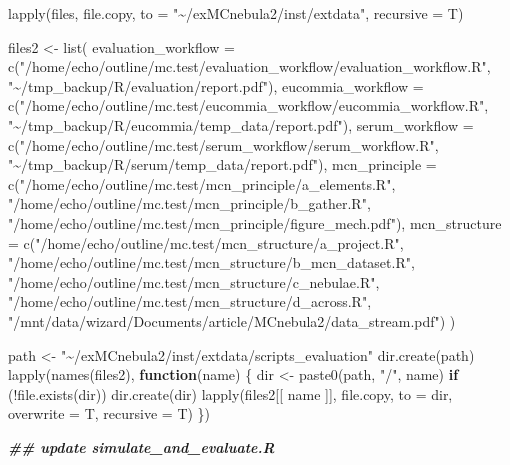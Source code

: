 \documentclass[
]{article}
\newenvironment{Shaded}{\begin{snugshade}}{\end{snugshade}}
\newcommand{\AttributeTok}[1]{\textcolor[rgb]{0.77,0.63,0.00}{#1}}
\newcommand{\ControlFlowTok}[1]{\textcolor[rgb]{0.13,0.29,0.53}{\textbf{#1}}}
\newcommand{\DocumentationTok}[1]{\textcolor[rgb]{0.56,0.35,0.01}{\textbf{\textit{#1}}}}
\newcommand{\FunctionTok}[1]{\textcolor[rgb]{0.00,0.00,0.00}{#1}}
\newcommand{\NormalTok}[1]{#1}
\newcommand{\OtherTok}[1]{\textcolor[rgb]{0.56,0.35,0.01}{#1}}
\newcommand{\SpecialCharTok}[1]{\textcolor[rgb]{0.00,0.00,0.00}{#1}}
\newcommand{\StringTok}[1]{\textcolor[rgb]{0.31,0.60,0.02}{#1}}
\begin{document}
\begin{Shaded}
\begin{Highlighting}[]
\FunctionTok{lapply}\NormalTok{(files, file.copy, }\AttributeTok{to =} \StringTok{"\textasciitilde{}/exMCnebula2/inst/extdata"}\NormalTok{,}
       \AttributeTok{recursive =}\NormalTok{ T)}

\NormalTok{files2 }\OtherTok{\textless{}{-}} \FunctionTok{list}\NormalTok{(}
  \AttributeTok{evaluation\_workflow =} \FunctionTok{c}\NormalTok{(}\StringTok{"/home/echo/outline/mc.test/evaluation\_workflow/evaluation\_workflow.R"}\NormalTok{,}
    \StringTok{"\textasciitilde{}/tmp\_backup/R/evaluation/report.pdf"}\NormalTok{),}
  \AttributeTok{eucommia\_workflow =} \FunctionTok{c}\NormalTok{(}\StringTok{"/home/echo/outline/mc.test/eucommia\_workflow/eucommia\_workflow.R"}\NormalTok{,}
    \StringTok{"\textasciitilde{}/tmp\_backup/R/eucommia/temp\_data/report.pdf"}\NormalTok{),}
  \AttributeTok{serum\_workflow =} \FunctionTok{c}\NormalTok{(}\StringTok{"/home/echo/outline/mc.test/serum\_workflow/serum\_workflow.R"}\NormalTok{,}
    \StringTok{"\textasciitilde{}/tmp\_backup/R/serum/temp\_data/report.pdf"}\NormalTok{),}
  \AttributeTok{mcn\_principle =} \FunctionTok{c}\NormalTok{(}\StringTok{"/home/echo/outline/mc.test/mcn\_principle/a\_elements.R"}\NormalTok{,}
    \StringTok{"/home/echo/outline/mc.test/mcn\_principle/b\_gather.R"}\NormalTok{,}
    \StringTok{"/home/echo/outline/mc.test/mcn\_principle/figure\_mech.pdf"}\NormalTok{),}
  \AttributeTok{mcn\_structure =} \FunctionTok{c}\NormalTok{(}\StringTok{"/home/echo/outline/mc.test/mcn\_structure/a\_project.R"}\NormalTok{,}
    \StringTok{"/home/echo/outline/mc.test/mcn\_structure/b\_mcn\_dataset.R"}\NormalTok{,}
    \StringTok{"/home/echo/outline/mc.test/mcn\_structure/c\_nebulae.R"}\NormalTok{,}
    \StringTok{"/home/echo/outline/mc.test/mcn\_structure/d\_across.R"}\NormalTok{,}
    \StringTok{"/mnt/data/wizard/Documents/article/MCnebula2/data\_stream.pdf"}\NormalTok{)}
\NormalTok{)}

\NormalTok{path }\OtherTok{\textless{}{-}} \StringTok{"\textasciitilde{}/exMCnebula2/inst/extdata/scripts\_evaluation"}
\FunctionTok{dir.create}\NormalTok{(path)}
\FunctionTok{lapply}\NormalTok{(}\FunctionTok{names}\NormalTok{(files2),}
  \ControlFlowTok{function}\NormalTok{(name) \{}
\NormalTok{    dir }\OtherTok{\textless{}{-}} \FunctionTok{paste0}\NormalTok{(path, }\StringTok{"/"}\NormalTok{, name)}
    \ControlFlowTok{if}\NormalTok{ (}\SpecialCharTok{!}\FunctionTok{file.exists}\NormalTok{(dir))}
      \FunctionTok{dir.create}\NormalTok{(dir)}
    \FunctionTok{lapply}\NormalTok{(files2[[ name ]], file.copy,}
      \AttributeTok{to =}\NormalTok{ dir, }\AttributeTok{overwrite =}\NormalTok{ T, }\AttributeTok{recursive =}\NormalTok{ T)}
\NormalTok{  \})}

\DocumentationTok{\#\# update simulate\_and\_evaluate.R}
\end{Highlighting}
\end{Shaded}
\end{document}
